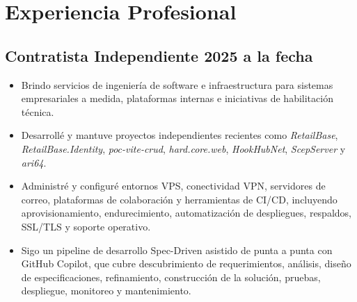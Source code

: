 \section*{Experiencia Profesional}

\subsection*{Contratista Independiente \hfill 2025 a la fecha}
\begin{itemize}[leftmargin=12pt]
    \item Brindo servicios de ingeniería de software e infraestructura para sistemas empresariales a medida, plataformas internas e iniciativas de habilitación técnica.
    \item Desarrollé y mantuve proyectos independientes recientes como \textit{RetailBase}, \textit{RetailBase.Identity}, \textit{poc-vite-crud}, \textit{hard.core.web}, \textit{HookHubNet}, \textit{ScepServer} y \textit{ari64}.
    \item Administré y configuré entornos VPS, conectividad VPN, servidores de correo, plataformas de colaboración y herramientas de CI/CD, incluyendo aprovisionamiento, endurecimiento, automatización de despliegues, respaldos, SSL/TLS y soporte operativo.
    \item Sigo un pipeline de desarrollo Spec-Driven asistido de punta a punta con GitHub Copilot, que cubre descubrimiento de requerimientos, análisis, diseño de especificaciones, refinamiento, construcción de la solución, pruebas, despliegue, monitoreo y mantenimiento.
\end{itemize}

